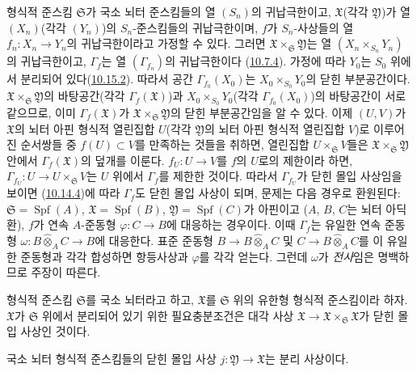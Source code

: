 형식적 준스킴 $\mathfrak{S}$가 국소 뇌터 준스킴들의 열
$(S_n)$의 귀납극한이고, $\mathfrak{X}$(각각 $\mathfrak{Y}$)가 열
$(X_n)$(각각 $(Y_n)$)의 $S_n$-준스킴들의 귀납극한이며, $f$가 $S_n$-사상들의 열
$f_n:X_n\to Y_n$의 귀납극한이라고 가정할 수 있다. 그러면
$\mathfrak{X}\times_{\mathfrak{S}}\mathfrak{Y}$는 열
$(X_n\times_{S_n}Y_n)$의 귀납극한이고, $\Gamma_f$는 열
$(\Gamma_{f_n})$의 귀납극한이다
(\hyperref[I.10.7.4-ko]{10.7.4}). 가정에 따라 $Y_0$는 $S_0$ 위에서
분리되어 있다(\hyperref[I.10.15.2-ko]{10.15.2}). 따라서 공간
$\Gamma_{f_0}(X_0)$는 $X_0\times_{S_0}Y_0$의 닫힌 부분공간이다.
$\mathfrak{X}\times_{\mathfrak{S}}\mathfrak{Y}$의 바탕공간(각각
$\Gamma_f(\mathfrak{X})$)과 $X_0\times_{S_0}Y_0$(각각
$\Gamma_{f_0}(X_0)$)의 바탕공간이 서로 같으므로, 이미
$\Gamma_f(\mathfrak{X})$가
$\mathfrak{X}\times_{\mathfrak{S}}\mathfrak{Y}$의 닫힌
부분공간임을 알 수 있다. 이제 $(U,V)$가 $\mathfrak{X}$의 뇌터 아핀
형식적 열린집합 $U$(각각 $\mathfrak{Y}$의 뇌터 아핀 형식적 열린집합
$V$)로 이루어진 순서쌍들 중 $f(U)\subset V$를 만족하는 것들을
취하면, 열린집합 $U\times_{\mathfrak{S}}V$들은
$\mathfrak{X}\times_{\mathfrak{S}}\mathfrak{Y}$ 안에서
$\Gamma_f(\mathfrak{X})$의 덮개를 이룬다. $f_U:U\to V$를 $f$의
$U$로의 제한이라 하면, $\Gamma_{f_U}:U\to
U\times_{\mathfrak{S}}V$는 $U$ 위에서 $\Gamma_f$를 제한한 것이다.
따라서 $\Gamma_{f_U}$가 닫힌 몰입 사상임을 보이면
(\hyperref[I.10.14.4-ko]{10.14.4})에 따라 $\Gamma_f$도 닫힌 몰입
사상이 되며, 문제는 다음 경우로 환원된다:
$\mathfrak{S}=\operatorname{Spf}(A)$,
$\mathfrak{X}=\operatorname{Spf}(B)$,
$\mathfrak{Y}=\operatorname{Spf}(C)$가 아핀이고
($A$, $B$, $C$는 뇌터 아딕환), $f$가 연속 $A$-준동형
$\varphi:C\to B$에 대응하는 경우이다. 이때 $\Gamma_f$는 유일한 연속
준동형
$\omega:B\widehat{\otimes}_A C\to B$에 대응한다. 표준 준동형
$B\to B\widehat{\otimes}_A C$ 및
$C\to B\widehat{\otimes}_A C$를 이 유일한 준동형과 각각 합성하면 항등사상과
$\varphi$를 각각 얻는다. 그런데 $\omega$가
\emph{전사}임은 명백하므로 주장이 따른다.

\begin{corollary}[10.15.5]
\label{I.10.15.5-ko}
형식적 준스킴 $\mathfrak{S}$를 국소 뇌터라고 하고,
$\mathfrak{X}$를 $\mathfrak{S}$ 위의 유한형 형식적 준스킴이라 하자.
$\mathfrak{X}$가 $\mathfrak{S}$ 위에서 분리되어 있기 위한 필요충분조건은
대각 사상
$\mathfrak{X}\to\mathfrak{X}\times_{\mathfrak{S}}\mathfrak{X}$가
닫힌 몰입 사상인 것이다.
\end{corollary}

\begin{proposition}[10.15.6]
\label{I.10.15.6-ko}
국소 뇌터 형식적 준스킴들의 닫힌 몰입 사상
$j:\mathfrak{Y}\to\mathfrak{X}$는 분리 사상이다.
\end{proposition}

